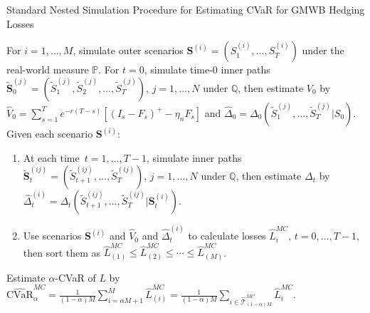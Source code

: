\documentclass{article}
\newcommand{\CVaR}{\mbox{CVaR}}
\newcommand{\tail}{\mathcal{T}}
\newcommand{\bS}{\bm{S}}
\newcommand{\bStilde}{\widetilde{\bm{S}}}
\newcommand{\Stilde}{\widetilde{S}}
\newcommand{\Vhat}{\widehat{V}}
\newcommand{\Lhat}{\widehat{L}}
\newcommand{\Deltahat}{\widehat{\Delta}}
\begin{document}


\begin{algorithm} 
\caption{Standard Nested Simulation Procedure for Estimating CVaR for GMWB Hedging Losses}
\begin{algorithmic}[1] \label{alg:standardProcedure}
    \STATE  For $i=1,\ldots,M$, simulate outer scenarios $\bS^{(i)} = (S_{1}^{(i)},\ldots,S_{T}^{(i)})$ under the real-world measure $\mathbb{P}$.
    \STATE  For $t=0$, simulate time-$0$ inner paths $\bStilde_{0}^{(j)} = (\Stilde_{1}^{(j)},\Stilde_{2}^{(j)},\ldots,\Stilde_{T}^{(j)})$, $j=1,\ldots,N$ under $\mathbb{Q}$, then estimate $V_0$ by $\Vhat_0 = \sum_{s=1}^{T} e^{-r(T-s)} [(I_s - F_s)^+- \eta_n F_s]$ and $\Deltahat_0 = \Delta_0(\Stilde_{1}^{(j)},\ldots,\Stilde_{T}^{(j)} | S_0)$.
    \STATE  Given each scenario $\bS^{(i)}$:
    \begin{enumerate}[label=\alph*., itemsep=0pt, parsep=0pt, topsep=0pt]
        \item   At each time~$t=1,\ldots,T-1$, simulate inner paths $\bStilde_{t}^{(ij)} = (\Stilde_{t+1}^{(ij)},\ldots,\Stilde_{T}^{(ij)})$, $j=1,\ldots,N$ under $\mathbb{Q}$, then estimate $\Delta_t$ by $\Deltahat_t^{(i)} = \Delta_t(\Stilde_{t+1}^{(ij)},\ldots,\Stilde_{T}^{(ij)} | \bm{S}_t^{(i)})$.
        \item   Use scenarios $\bS^{(i)}$ and $\Vhat_0$ and $\Deltahat_t^{(i)}$ to calculate losses $\Lhat_i^{MC}$, $t=0,\ldots,T-1$, then sort them as $\Lhat^{MC}_{(1)}\leq \Lhat^{MC}_{(2)} \leq \cdots\leq \Lhat^{MC}_{(M)}$.
    \end{enumerate}
    \STATE  Estimate $\alpha$-CVaR of $L$ by $\widehat{\CVaR}^{MC}_\alpha = \frac{1}{(1-\alpha)M} \sum_{i=\alpha M + 1}^{M}\Lhat_{(i)}^{MC} = \frac{1}{(1-\alpha)M} \sum_{i \in \widehat{\tail}_{(1-\alpha )M}^{MC}}\Lhat_{i}^{MC}$.
\end{algorithmic}
\end{algorithm}
\end{document}
